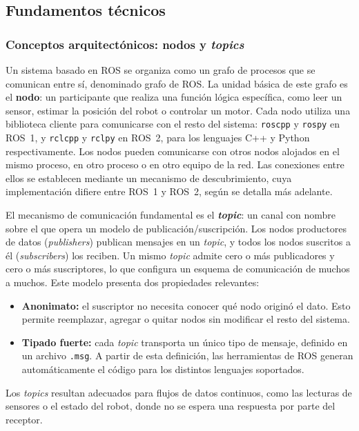 \subsection{Fundamentos técnicos}

\subsubsection{Conceptos arquitectónicos: nodos y \textit{topics}}

Un sistema basado en ROS se organiza como un grafo de procesos que se
comunican entre sí, denominado grafo de ROS. La unidad básica de este grafo es
el \textbf{nodo}: un participante que realiza una función lógica específica,
como leer un sensor, estimar la posición del robot o controlar un motor. Cada
nodo utiliza una biblioteca cliente para comunicarse con el resto del sistema:
\texttt{roscpp} y \texttt{rospy} en ROS~1, y \texttt{rclcpp} y \texttt{rclpy}
en ROS~2, para los lenguajes C++ y Python respectivamente. Los nodos pueden
comunicarse con otros nodos alojados en el mismo proceso, en otro proceso o en
otro equipo de la red. Las conexiones entre ellos se establecen mediante un
mecanismo de descubrimiento, cuya implementación difiere entre ROS~1 y ROS~2,
según se detalla más adelante.

El mecanismo de comunicación fundamental es el \textbf{\textit{topic}}: un canal
con nombre sobre el que opera un modelo de publicación/suscripción. Los nodos
productores de datos (\textit{publishers}) publican mensajes en un
\textit{topic}, y todos los nodos suscritos a él (\textit{subscribers}) los
reciben. Un mismo \textit{topic} admite cero o más publicadores y cero o más
suscriptores, lo que configura un esquema de comunicación de muchos a muchos.
Este modelo presenta dos propiedades relevantes:
\begin{itemize}
    \item \textbf{Anonimato:} el suscriptor no necesita conocer qué nodo
    originó el dato. Esto permite reemplazar, agregar o quitar nodos sin
    modificar el resto del sistema.
    \item \textbf{Tipado fuerte:} cada \textit{topic} transporta un único tipo
    de mensaje, definido en un archivo \texttt{.msg}. A partir de esta
    definición, las herramientas de ROS generan automáticamente el código para
    los distintos lenguajes soportados.
\end{itemize}

Los \textit{topics} resultan adecuados para flujos de datos continuos, como
las lecturas de sensores o el estado del robot, donde no se espera una
respuesta por parte del receptor.

